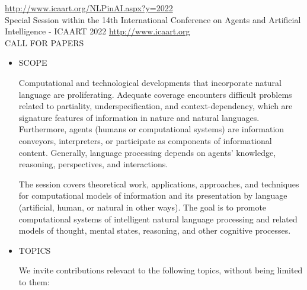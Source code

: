\documentclass[prodmode,acmtecs]{acmsmall} %
\begin{document}
  \href{http://www.icaart.org/NLPinAI.aspx?y=2022}{http://www.icaart.org/NLPinAI.aspx?y=2022}\\ 
  Special Session within the 14th International Conference on Agents and Artificial Intelligence - ICAART 2022 \href{http://www.icaart.org}{http://www.icaart.org}\\ 
CALL FOR PAPERS 

\begin{itemize}\item  SCOPE  
 
  Computational and technological developments that incorporate natural language are proliferating. Adequate coverage encounters difficult problems related to partiality, underspecification, and context-dependency, which are signature features of information in nature and natural languages. Furthermore, agents (humans or computational systems) are information conveyors, interpreters, or participate as components of informational content. Generally, language processing depends on agents' knowledge, reasoning, perspectives, and interactions. 
 
  The session covers theoretical work, applications, approaches, and techniques for computational models of information and its presentation by language (artificial, human, or natural in other ways). The goal is to promote computational systems of intelligent natural language processing and related models of thought, mental states, reasoning, and other cognitive processes. 
 
\item  TOPICS 
 
  We invite contributions relevant to the following topics, without being limited to them: 
 

\end{itemize}
\end{document}
